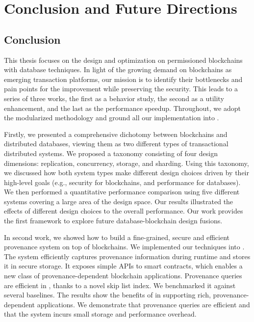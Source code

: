 
\chapter{Conclusion and Future Directions}
\label{ch:conclu}
\section{Conclusion}
This thesis focuses on the design and optimization on permissioned blockchains with database techniques. 
In light of the growing demand on blockchains as emerging transaction platforms, 
our mission is to identify their bottlenecks and pain points for the improvement while preserving the security.
This leads to a series of three works, the first as a behavior study, the second as a utility enhancement, and the last as the performance speedup. 
Throughout, we adopt the modularized methodology and ground all our implementation into {\fs}. 

Firstly, we presented a comprehensive dichotomy between blockchains and distributed databases, viewing them as two different types of transactional distributed systems. We proposed a taxonomy consisting of four design dimensions: replication, concurrency, storage, and sharding. Using this taxonomy, we discussed how both system types make different design choices driven by their high-level goals (e.g., security for blockchains, and performance for databases). We then performed a quantitative performance comparison using five different systems covering a large area of the design space. Our results illustrated the effects of different design choices to the overall performance. Our work provides the first framework to explore future database-blockchain design fusions. 

In second work, we showed how to build a fine-grained,
secure and efficient provenance system on top of blockchains. 
We implemented our techniques into {\fs}.
The system efficiently captures provenance information during runtime and stores it in secure storage. 
It exposes simple APIs to smart contracts, which enables a new class of provenance-dependent blockchain applications. 
Provenance queries are efficient in {\fs}, thanks to a novel skip
list index. We benchmarked it against several baselines. The results show the benefits of {\fs} in supporting rich,
provenance-dependent applications. We demonstrate that
provenance queries are efficient and that the system incurs
small storage and performance overhead.

